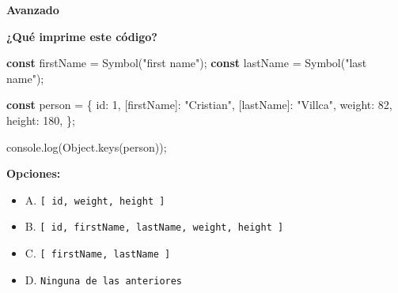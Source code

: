 \documentclass[
  letterpaper,
  DIV=11,
  numbers=noendperiod]{scrreprt}
\newenvironment{Shaded}{\begin{snugshade}}{\end{snugshade}}
\newcommand{\BuiltInTok}[1]{\textcolor[rgb]{0.00,0.23,0.31}{#1}}
\newcommand{\DataTypeTok}[1]{\textcolor[rgb]{0.68,0.00,0.00}{#1}}
\newcommand{\DecValTok}[1]{\textcolor[rgb]{0.68,0.00,0.00}{#1}}
\newcommand{\FunctionTok}[1]{\textcolor[rgb]{0.28,0.35,0.67}{#1}}
\newcommand{\KeywordTok}[1]{\textcolor[rgb]{0.00,0.23,0.31}{\textbf{#1}}}
\newcommand{\NormalTok}[1]{\textcolor[rgb]{0.00,0.23,0.31}{#1}}
\newcommand{\OperatorTok}[1]{\textcolor[rgb]{0.37,0.37,0.37}{#1}}
\newcommand{\StringTok}[1]{\textcolor[rgb]{0.13,0.47,0.30}{#1}}
\providecommand{\tightlist}{%
  \setlength{\itemsep}{0pt}\setlength{\parskip}{0pt}}
\begin{document}
\begin{tcolorbox}[enhanced jigsaw, left=2mm, toprule=.15mm, leftrule=.75mm, breakable, colback=white, coltitle=black, bottomtitle=1mm, arc=.35mm, rightrule=.15mm, colframe=quarto-callout-caution-color-frame, opacitybacktitle=0.6, toptitle=1mm, opacityback=0, titlerule=0mm, title=\textcolor{quarto-callout-caution-color}{\faFire}\hspace{0.5em}{Dificultad}, bottomrule=.15mm, colbacktitle=quarto-callout-caution-color!10!white]

\textbf{Avanzado}

\end{tcolorbox}

\textbf{¿Qué imprime este código?}

\begin{Shaded}
\begin{Highlighting}[]
\KeywordTok{const}\NormalTok{ firstName }\OperatorTok{=} \BuiltInTok{Symbol}\NormalTok{(}\StringTok{"first name"}\NormalTok{)}\OperatorTok{;}
\KeywordTok{const}\NormalTok{ lastName }\OperatorTok{=} \BuiltInTok{Symbol}\NormalTok{(}\StringTok{"last name"}\NormalTok{)}\OperatorTok{;}

\KeywordTok{const}\NormalTok{ person }\OperatorTok{=}\NormalTok{ \{}
  \DataTypeTok{id}\OperatorTok{:} \DecValTok{1}\OperatorTok{,}
\NormalTok{  [firstName]}\OperatorTok{:} \StringTok{"Cristian"}\OperatorTok{,}
\NormalTok{  [lastName]}\OperatorTok{:} \StringTok{"Villca"}\OperatorTok{,}
  \DataTypeTok{weight}\OperatorTok{:} \DecValTok{82}\OperatorTok{,}
  \DataTypeTok{height}\OperatorTok{:} \DecValTok{180}\OperatorTok{,}
\NormalTok{\}}\OperatorTok{;}

\BuiltInTok{console}\OperatorTok{.}\FunctionTok{log}\NormalTok{(}\BuiltInTok{Object}\OperatorTok{.}\FunctionTok{keys}\NormalTok{(person))}\OperatorTok{;}
\end{Highlighting}
\end{Shaded}

\textbf{Opciones:}

\begin{itemize}
\tightlist
\item
  A.
  \texttt{{[}\ \textquotesingle{}id\textquotesingle{},\ \textquotesingle{}weight\textquotesingle{},\ \textquotesingle{}height\textquotesingle{}\ {]}}
\item
  B.
  \texttt{{[}\ \textquotesingle{}id\textquotesingle{},\ \textquotesingle{}firstName\textquotesingle{},\ \textquotesingle{}lastName\textquotesingle{},\ \textquotesingle{}weight\textquotesingle{},\ \textquotesingle{}height\textquotesingle{}\ {]}}
\item
  C.
  \texttt{{[}\ \textquotesingle{}firstName\textquotesingle{},\ \textquotesingle{}lastName\textquotesingle{}\ {]}}
\item
  D. \texttt{Ninguna\ de\ las\ anteriores}
\end{itemize}
\end{document}
